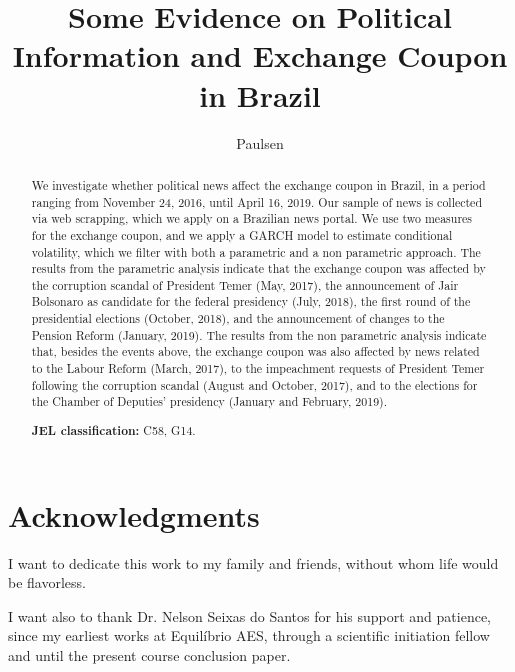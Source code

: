 \documentclass[cic,tc, english]{iiufrgs}
\title{Some Evidence on Political Information and Exchange Coupon in Brazil}
\author{Paulsen}{Bernardo Hillesheim}
\begin{document}



\chapter*{Acknowledgments}

I want to dedicate this work to my family and friends, without whom life would be flavorless. 

I want also to thank Dr. Nelson Seixas do Santos for his support and patience, since my earliest works at Equilíbrio AES, through a scientific initiation fellow and until the present course conclusion paper.



\begin{abstract}
    We investigate whether political news affect the exchange coupon in Brazil, in a period ranging from November 24, 2016, until April 16, 2019. Our sample of news is collected via web scrapping, which we apply on a Brazilian news portal. We use two measures for the exchange coupon, and we apply a GARCH model to estimate conditional volatility, which we filter with both a parametric and a non parametric approach. The results from the parametric analysis indicate that the exchange coupon was affected by the corruption scandal of President Temer (May, 2017), the announcement of Jair Bolsonaro as candidate for the federal presidency (July, 2018), the first round of the presidential elections (October, 2018), and the announcement of changes to the Pension Reform (January, 2019). The results from the non parametric analysis indicate that, besides the events above, the exchange coupon was also affected by news related to the Labour Reform (March, 2017), to the impeachment requests of President Temer following the corruption scandal (August and October, 2017), and to the elections for the Chamber of Deputies' presidency (January and February, 2019).
    
    \noindent
    \textbf{JEL classification:} C58, G14.
    
\end{abstract}

\listoffigures

\listoftables
\end{document}
